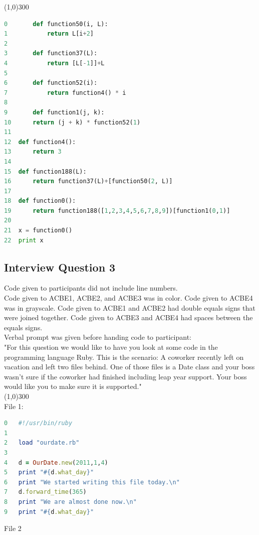 \documentclass{article}
\begin{document}
\line(1,0){300}
\begin{lstlisting}[language=python]
0		def function50(i, L):
1			return L[i+2]
2
3		def function37(L):
4			return [L[-1]]+L
5
6		def function52(i):
7			return function4() * i
8
9		def function1(j, k):
10		return (j + k) * function52(1)
11
12	def function4():
13		return 3
14
15	def function188(L):
16		return function37(L)+[function50(2, L)]
17
18	def function0():
19		return function188([1,2,3,4,5,6,7,8,9])[function1(0,1)]
20
21	x = function0()
22	print x

\end{lstlisting}

\newpage
\subsection{Interview Question 3}
Code given to participants did not include line numbers. \\
Code given to ACBE1, ACBE2, and ACBE3 was in color. Code given to ACBE4 was in grayscale. 
Code given to ACBE1 and ACBE2 had double equals signs that were joined together. Code given to ACBE3 and ACBE4 had spaces between the equals signs. \\
Verbal prompt was given before handing code to participant: \\
"For this question we would like to have you look at some code in the programming language Ruby. This is the scenario: A coworker recently left on vacation and left two files behind. One of those files is a Date class and your boss wasn't sure if the coworker had finished including leap year support. Your boss would like you to make sure it is supported." \\
\line(1,0){300} \\
File 1: \\
\begin{lstlisting}[language=ruby]
0	#!/usr/bin/ruby
1	
2	load "ourdate.rb"
3	
4	d = OurDate.new(2011,1,4)
5	print "#{d.what_day}"
6	print "We started writing this file today.\n"
7	d.forward_time(365)
8	print "We are almost done now.\n"
9	print "#{d.what_day}"

\end{lstlisting} 
\vspace{1cm} File 2
\end{document}
